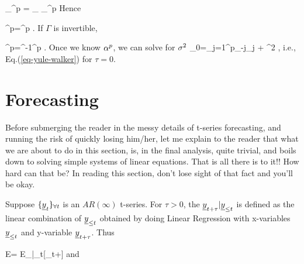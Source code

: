 \beq
{}_{\gamma^p}
=
_{\Gamma}
_{\alp^p}
\eeq
Hence

\beq
\gamma^p=\Gamma \alp^p
\;.
\eeq
If $\Gamma$
is invertible,

\beq
\alp^p=\Gamma^{-1}\gamma^p
\;.
\eeq
Once we know $\alpha^p$,
we can solve for $\sigma^2$
\beq
\gamma_0=\sum_{j=1}^p\gamma_{-j}\alp_j
+ \s^2
\;,
\eeq
i.e.,
Eq.(\ref{eq-yule-walker}) for $\tau=0$.



\section{Forecasting}




Before
submerging
the reader
in the messy details
of t-series forecasting,
and running
the risk of quickly losing him/her,
let me explain to the reader that
what we are about
to do in this section, is, in the final
analysis, quite trivial,
and boils down to
solving simple
systems
of linear equations.
That is all there is to it!!
How hard can that be?
In reading this section,
don't lose sight of that fact and
you'll be okay.

Suppose
$\tseries{\rvy_t}$
is an $AR(\infty)$ t-series. For $\tau>0$,
the 
$\rvy_{t+\tau}|\rvy_{\leq t}$
is defined as the
linear combination of $\rvy_{\leq t}$
obtained by doing
Linear Regression
with x-variables
$\rvy_{\leq t}$
and y-variable
$\rvy_{t+\tau}$. Thus

\beq
E
=
E_{|\rvy_{\leq t}}[\rvy_{t+\tau}]
\eeq
and

